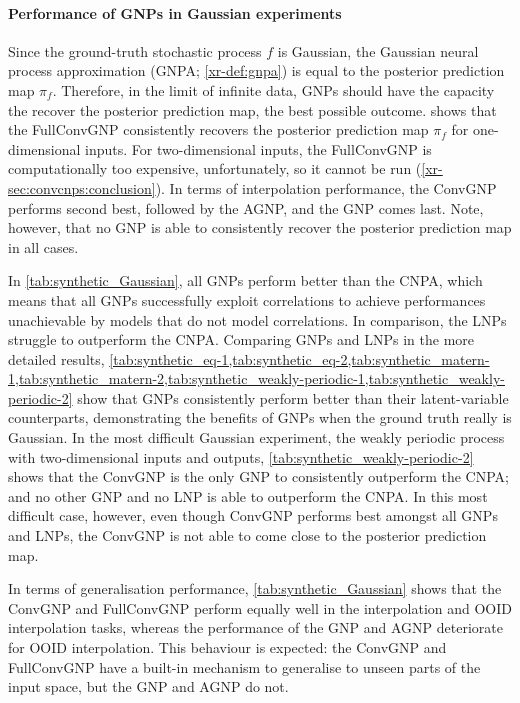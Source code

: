 \documentclass[12pt, twoside]{report}
\newcommand{\xrprefix}[1]{xr-#1}
\begin{document}
\paragraph{Performance of GNPs in Gaussian experiments}
Since the ground-truth stochas\-tic process $f$ is Gaussian, the Gaussian neural process approximation (GNPA; \cref{\xrprefix{def:gnpa}}) is equal to the posterior prediction map $\pi_f$. 
Therefore, in the limit of infinite data, GNPs should have the capacity the recover the posterior prediction map, the best possible outcome.
 shows that the FullConvGNP consistently recovers the posterior prediction map $\pi_f$ for one-dimensional inputs.
For two-dimensional inputs, the FullConvGNP is computationally too expensive, unfortunately, so it cannot be run (\cref{\xrprefix{sec:convcnps:conclusion}}).
In terms of interpolation performance, the ConvGNP performs second best, followed by the AGNP, and the GNP comes last.
Note, however, that no GNP is able to consistently recover the posterior prediction map in all cases.

In \cref{tab:synthetic_Gaussian}, all GNPs perform better than the CNPA, which means that all GNPs successfully exploit correlations to achieve performances unachievable by models that do not model correlations.
In comparison, the LNPs struggle to outperform the CNPA.
Comparing GNPs and LNPs in the more detailed results, \cref{tab:synthetic_eq-1,tab:synthetic_eq-2,tab:synthetic_matern-1,tab:synthetic_matern-2,tab:synthetic_weakly-periodic-1,tab:synthetic_weakly-periodic-2} show that GNPs consistently perform better than their latent-variable counterparts,
demonstrating the benefits of GNPs when the ground truth really is Gaussian.
In the most difficult Gaussian experiment, the weakly periodic process with two-dimensional inputs and outputs,
\cref{tab:synthetic_weakly-periodic-2} shows that the ConvGNP is the only GNP to consistently outperform the CNPA;
and no other GNP and no LNP is able to outperform the CNPA.
In this most difficult case, however, even though ConvGNP performs best amongst all GNPs and LNPs, the ConvGNP is not able to come close to the posterior prediction map.

In terms of generalisation performance,
\cref{tab:synthetic_Gaussian} shows that
the ConvGNP and FullConvGNP perform equally well in the interpolation and OOID interpolation tasks,
whereas the performance of the GNP and AGNP deteriorate for OOID interpolation.
This behaviour is expected:
the ConvGNP and FullConvGNP have a built-in mechanism to generalise to unseen parts of the input space,
but the GNP and AGNP do not.
\end{document}
